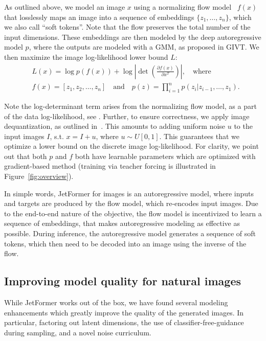 \documentclass{article} %
\newcommand{\name}{JetFormer\xspace}
\begin{document}
As outlined above, we model an image $x$ using a normalizing flow model~\citep{dinh2014nice,dinh2016density,kingma2018glow} $f(x)$ that losslessly maps an image into a sequence of embeddings $\{z_1, \dots, z_n\}$, which we also call ``soft tokens''. Note that the flow preserves the total number of the input dimensions. These embeddings are then modeled by the deep autoregressive model $p$, where the outputs are modeled with a GMM, as proposed in GIVT. We then maximize the image log-likelihood lower bound $L$:
\begin{align}
        &L(x) = \log p(f(x)) + \log \left| \det \left(\frac{\partial f(x)}{\partial x^T}\right)\right|, \quad\mathrm{where} \label{eq:loss} \\
        &f(x) = [z_1, z_2, \dots, z_n] \quad\mathrm{and}\quad
        p(z) = \prod\limits_{i=1}^n p(z_i | z_{i-1}, \dots, z_1).
\end{align}

\vspace{-1mm}

Note the log-determinant term arises from the normalizing flow model, as a part of the data log-likelihood, see \cite{dinh2016density}. Further, to ensure correctness, we apply image dequantization, as outlined in~\cite{theis2015note}. This amounts to adding uniform noise $u$ to the input images $I$, s.t. $x = I + u$, where $u \sim U[0, 1]$. This guarantees that we optimize a lower bound on the discrete image log-likelihood. For clarity, we point out that both $p$ and $f$ both have learnable parameters which are optimized with gradient-based method (training via teacher forcing is illustrated in Figure~\ref{fig:overview}).

In simple words, \name for images is an autoregressive model, where inputs and targets are produced by the flow model, which re-encodes input images.  Due to the end-to-end nature of the objective, the flow model is incentivized to learn a sequence of embeddings, that makes autoregressive modeling as effective as possible. During inference, the autoregressive model generates a sequence of soft tokens, which then need to be decoded into an image using the inverse of the flow.


\subsection{Improving model quality for natural images}
\label{sec:improve-model-quality}
While \name works out of the box, we have found several modeling enhancements which greatly improve the quality of the generated images. In particular, factoring out latent dimensions, the use of classifier-free-guidance during sampling, and a novel noise curriculum.
\end{document}
